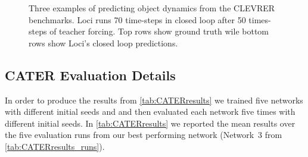 \documentclass{article} \usepackage{iclr2023_conference_arxiv,times}
\def\imagepaddingtiny{0.1cm}
\begin{document}
\begin{figure}[htb!]
\begin{elasticrow}[\imagepaddingtiny]
    \end{elasticrow}
    \vskip\imagepaddingtiny
    \begin{elasticrow}[\imagepaddingtiny]
    \end{elasticrow}

    \caption{Three examples of predicting object dynamics from the CLEVRER\citep{yi2019clevrer} benchmarks. Loci runs 70 time-steps in closed loop after 50 times-steps of teacher forcing. Top rows show ground truth wile bottom rows show Loci's closed loop predictions.} 
    \label{fig:clevrer_prediction}
\end{figure}

\subsection{CATER Evaluation Details}

In order to produce the results from \autoref{tab:CATERresults} we trained five networks with different initial seeds and and then evaluated each network five times with different initial seeds. In \autoref{tab:CATERresults} we reported the mean results over the five evaluation runs from our best performing network (Network~3 from \autoref{tab:CATERresults_runs}).
\end{document}
